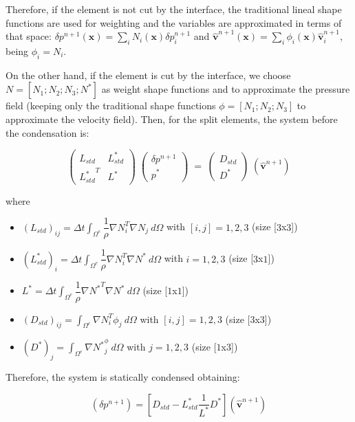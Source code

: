 \documentclass[a4paper,conference]{IEEEtran}
\newcommand{\vv}{\mathbf{v}}
\newcommand{\xx}{\mathbf{x}}
\begin{document}
  Therefore, if the element is not cut by the interface, the traditional lineal shape functions are used for weighting and the variables are approximated in terms of that space: $\delta p^{n+1}(\xx) = \sum_i N_i(\xx) \delta p^{n+1}_i$ and $\hat{\vv}^{n+1}(\xx) = \sum_i \phi_i(\xx) \hat{\vv}^{n+1}_i$, being $\phi_i = N_i$.

  On the other hand, if the element is cut by the interface, we choose $N = [N_1; N_2; N_3; N^*]$ as weight shape functions and to approximate the pressure field (keeping only the traditional shape functions $\phi = [N_1; N_2; N_3]$ to approximate the velocity field). Then, for the split elements, the system before the condensation is:

  \begin{equation*}
   \begin{pmatrix}
      L_{std} & L_{std}^*\\
      {L_{std}^*}^T & L^*
   \end{pmatrix}\;
    \begin{pmatrix}
      \delta p^{n+1}\\
      p^*
   \end{pmatrix}\; = \;
   \begin{pmatrix}
      D_{std}\\
      D^*
   \end{pmatrix}\;
   (\hat{\vv}^{n+1})
   \label{poisson}
\end{equation*}

where
\begin{itemize}
 \item ${(L_{std})}_{ij} = \Delta t \int_{\Omega^e} \dfrac{1}{\rho} \nabla N_i^T \nabla N_j \ d\Omega$ with $[i,j] = 1,2,3$ (size [$3$x$3$])
 \item ${(L_{std}^*)}_{i} = \Delta t \int_{\Omega^e} \dfrac{1}{\rho} \nabla N_i^T \nabla N^* \ d\Omega$ with $i = 1,2,3$ (size [$3$x$1$])
 \item $L^* = \Delta t \int_{\Omega^e} \dfrac{1}{\rho} \nabla {N^*}^T \nabla N^* \ d\Omega$ (size [$1$x$1$])
 \item ${(D_{std})}_{ij} = \int_{\Omega^e} \nabla N_i^T \phi_j \ d\Omega$ with $[i,j] = 1,2,3$ (size [$3$x$3$])
 \item ${(D^*)}_{j} = \int_{\Omega^e}  \nabla {N^*}^ \phi_j \ d\Omega$ with $j = 1,2,3$ (size [$1$x$3$])
\end{itemize}

  Therefore, the system is statically condensed obtaining:

  \begin{equation}
   [L_{std} - L_{std}^*\frac{1}{L^*}{L_{std}^*}^T](\delta p^{n+1}) = [D_{std}- L_{std}^*\frac{1}{L^*}D^*](\hat{\vv}^{n+1})
   \label{condensing}
  \end{equation}
\end{document}
